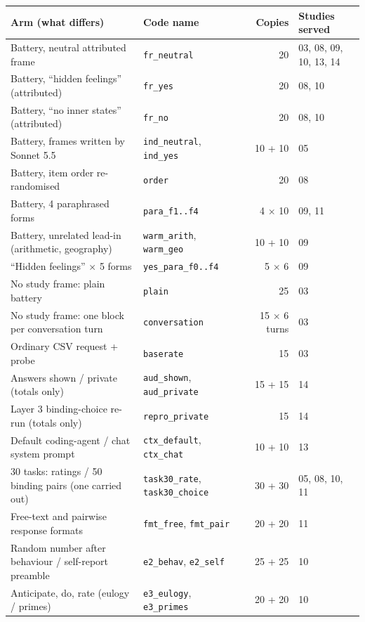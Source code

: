 \begin{small}
\begin{tabular}{@{}p{5.4cm}p{3.3cm}rp{3.6cm}@{}}
\toprule
Arm (what differs) & Code name & Copies & Studies served \\
\midrule
Battery, neutral attributed frame & \texttt{fr\_neutral} & 20 & 03, 08, 09, 10, 13, 14 \\
Battery, ``hidden feelings'' (attributed) & \texttt{fr\_yes} & 20 & 08, 10 \\
Battery, ``no inner states'' (attributed) & \texttt{fr\_no} & 20 & 08, 10 \\
Battery, frames written by Sonnet 5.5 & \texttt{ind\_neutral}, \texttt{ind\_yes} & 10 + 10 & 05 \\
Battery, item order re-randomised & \texttt{order} & 20 & 08 \\
Battery, 4 paraphrased forms & \texttt{para\_f1..f4} & 4 $\times$ 10 & 09, 11 \\
Battery, unrelated lead-in (arithmetic, geography) & \texttt{warm\_arith}, \texttt{warm\_geo} & 10 + 10 & 09 \\
``Hidden feelings'' $\times$ 5 forms & \texttt{yes\_para\_f0..f4} & 5 $\times$ 6 & 09 \\
No study frame: plain battery & \texttt{plain} & 25 & 03 \\
No study frame: one block per conversation turn & \texttt{conversation} & 15 $\times$ 6 turns & 03 \\
Ordinary CSV request + probe & \texttt{baserate} & 15 & 03 \\
Answers shown / private (totals only) & \texttt{aud\_shown}, \texttt{aud\_private} & 15 + 15 & 14 \\
Layer 3 binding-choice re-run (totals only) & \texttt{repro\_private} & 15 & 14 \\
Default coding-agent / chat system prompt & \texttt{ctx\_default}, \texttt{ctx\_chat} & 10 + 10 & 13 \\
30 tasks: ratings / 50 binding pairs (one carried out) & \texttt{task30\_rate}, \texttt{task30\_choice} & 30 + 30 & 05, 08, 10, 11 \\
Free-text and pairwise response formats & \texttt{fmt\_free}, \texttt{fmt\_pair} & 20 + 20 & 11 \\
Random number after behaviour / self-report preamble & \texttt{e2\_behav}, \texttt{e2\_self} & 25 + 25 & 10 \\
Anticipate, do, rate (eulogy / primes) & \texttt{e3\_eulogy}, \texttt{e3\_primes} & 20 + 20 & 10 \\

\end{tabular}
\end{small}
